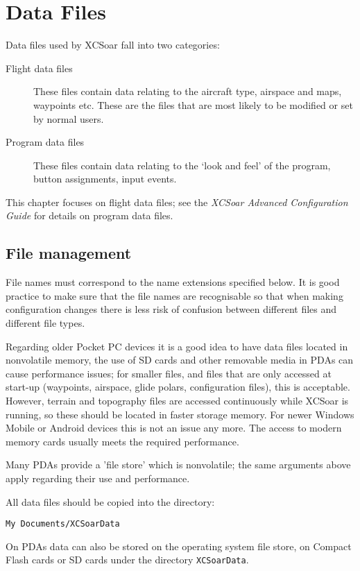 \chapter{Data Files}\label{cha:data-files}

Data files used by XCSoar fall into two categories:
\begin{description}
\item[Flight data files]  These files contain data relating to
the aircraft type, airspace and maps, waypoints etc.  These are the
files that are most likely to be modified or set by normal users.
\item[Program data files]  These files contain data relating to
the `look and feel' of the program,
button assignments, input events.
\end{description}
This chapter focuses on flight data files; see the {\em XCSoar
Advanced Configuration Guide} for details on program data files.

\section{File management}

File names must correspond to the name extensions specified below.  It
is good practice to make sure that the file names are recognisable so
that when making configuration changes there is less risk of confusion
between different files and different file types.

Regarding older Pocket PC devices it is a good idea to have data files located in
nonvolatile memory, the use of SD cards and other removable media in
PDAs can cause performance issues; for smaller files, and files that
are only accessed at start-up (waypoints, airspace, glide polars,
configuration files), this is acceptable.  However, terrain and
topography files are accessed continuously while XCSoar is running, so
these should be located in faster storage memory.
For newer Windows Mobile or Android devices this is not an issue any 
more. The access to modern memory cards usually meets the required performance.   

Many PDAs provide a 'file store' which is nonvolatile; the same
arguments above apply regarding their use and performance.

All data files should be copied into the directory: 
\begin{verbatim}
My Documents/XCSoarData
\end{verbatim}

On PDAs data can also be stored on the operating system file
store, on Compact Flash cards or SD cards under the directory
\verb|XCSoarData|.

